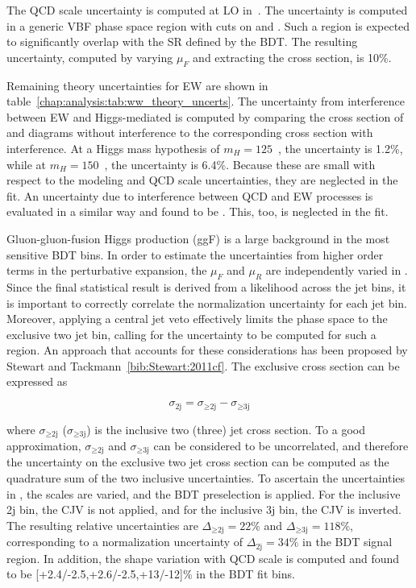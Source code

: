 The QCD scale uncertainty is computed at LO
in~\cite{bib:Jager:2006zc}. The uncertainty is computed in a generic
VBF phase space region with cuts on \dyjj and \mjj. Such a region is
expected to significantly overlap with the SR defined by the BDT. The
resulting uncertainty, computed by varying $\mu_F$ and extracting the
cross section, is 10\%.

Remaining theory uncertainties for EW \ww are shown in
table~\ref{chap:analysis:tab:ww_theory_uncerts}. The uncertainty from
interference
between EW \ww and Higgs-mediated \ww is computed by comparing the
cross section of \ww and \hww diagrams without interference to the
corresponding cross section with interference. At a Higgs mass
hypothesis of $m_H = 125$~\gev, the uncertainty is 1.2\%, while at
$m_H = 150$~\gev, the uncertainty is 6.4\%. Because these are small
with respect to the modeling and QCD scale uncertainties, they are
neglected in the fit. An uncertainty due to interference between QCD
and EW \ww processes is evaluated in a similar way and found to
be . This, too, is neglected in the fit.

Gluon-gluon-fusion Higgs production (ggF) is a large background in the
most sensitive BDT bins. In order to estimate the uncertainties from
higher order terms in the perturbative expansion, the $\mu_F$ and
$\mu_R$ are independently varied in \MCFM. Since the final statistical
result is derived from a likelihood across the jet bins, it is
important to correctly correlate the normalization uncertainty for
each jet bin. Moreover, applying a central jet veto effectively limits
the phase space to the exclusive two jet bin, calling for the
uncertainty to be computed for such a region. An approach that
accounts for these considerations has been proposed by Stewart and
Tackmann~\ref{bib:Stewart:2011cf}. The exclusive cross section can be
expressed as 

\begin{equation}
\sigma_{\textrm{2j}} = \sigma_{\geq\textrm{2j}} - \sigma_{\geq\textrm{3j}}
\end{equation}

where $\sigma_{\geq\textrm{2j}}$ ($\sigma_{\geq\textrm{3j}}$) is the
inclusive two (three) jet cross section. To a good approximation,
$\sigma_{\geq\textrm{2j}}$ and $\sigma_{\geq\textrm{3j}}$ can be
considered to be uncorrelated, and therefore the uncertainty on the
exclusive two jet cross section can be computed as the quadrature sum
of the two inclusive uncertainties. To ascertain the uncertainties
in \MCFM, the scales are varied, and the BDT preselection is
applied. For the inclusive 2j bin, the CJV is not applied, and for the
inclusive 3j bin, the CJV is inverted. The resulting relative
uncertainties are $\Delta_{\geq\textrm{2j}} = 22\%$ and
$\Delta_{\geq\textrm{3j}} = 118\%$, corresponding to a normalization
uncertainty of $\Delta_{\textrm{2j}} = 34\%$ in the BDT signal
region. In addition, the shape variation with QCD scale is computed
and found to be [+2.4/-2.5,+2.6/-2.5,+13/-12]\% in the BDT fit
bins. 

